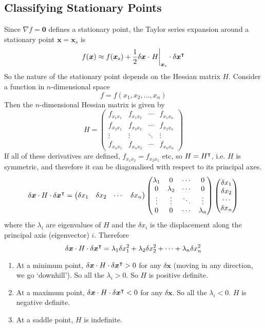 \documentclass{article}
\begin{document}
	\subsection{Classifying Stationary Points}
	Since $\nabla f = \bm 0$ defines a stationary point, the Taylor series expansion around a stationary point $\bm x = \bm x_s$ is
	\[ f(\bm x) \approx f(\bm x_s) + \frac{1}{2}\delta \bm x \cdot \eval{H}_{\bm x_s} \cdot \delta \bm x^\transpose \]
	So the nature of the stationary point depends on the Hessian matrix $H$. Consider a function in $n$-dimensional space
	\[ f = f(x_1, x_2, \dots, x_n) \]
	Then the $n$-dimensional Hessian matrix is given by
	\[ H = \begin{pmatrix}
		f_{x_1x_1} & f_{x_1x_2} & \cdots & f_{x_1x_n} \\
		f_{x_2x_1} & f_{x_2x_2} & \cdots & f_{x_2x_n} \\
		\vdots & \vdots & \ddots & \vdots \\
		f_{x_nx_1} & f_{x_nx_2} & \cdots & f_{x_nx_n}
	\end{pmatrix} \]
	If all of these derivatives are defined, $f_{x_1x_2} = f_{x_2x_1}$ etc, so $H = H^\intercal$, i.e. $H$ is symmetric, and therefore it can be diagonalised with respect to its principal axes.
	\[ \delta \bm x \cdot H \cdot \delta \bm x^\intercal = \begin{pmatrix}
		\delta x_1 & \delta x_2 & \cdots & \delta x_n
	\end{pmatrix} \begin{pmatrix}
		\lambda_1 & 0 & \cdots & 0 \\
		0 & \lambda_2 & \cdots & 0 \\
		\vdots & \vdots & \ddots & \vdots \\
		0 & 0 & \cdots & \lambda_n
	\end{pmatrix} \begin{pmatrix}
		\delta x_1 \\ \delta x_2 \\ \cdots \\ \delta x_n
	\end{pmatrix} \]
	where the $\lambda_i$ are eigenvalues of $H$ and the $\delta x_i$ is the displacement along the principal axis (eigenvector) $i$. Therefore
	\[ \delta \bm x \cdot H \cdot \delta \bm x^\intercal = \lambda_1 \delta x_1^2 + \lambda_2 \delta x_2^2 + \dots + \lambda_n \delta x_n^2 \]
	\begin{enumerate}
		\item At a minimum point, $\delta \bm x \cdot H \cdot \delta \bm x^\intercal > 0$ for any $\delta \bm x$ (moving in any direction, we go `downhill'). So all the $\lambda_i > 0$. So $H$ is positive definite.
		\item At a maximum point, $\delta \bm x \cdot H \cdot \delta \bm x^\intercal < 0$ for any $\delta \bm x$. So all the $\lambda_i < 0$. $H$ is negative definite.
		\item At a saddle point, $H$ is indefinite.
	\end{enumerate}
\end{document}
